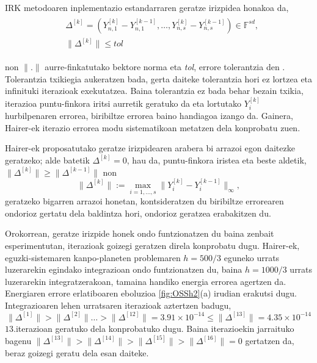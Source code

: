 IRK metodoaren inplementazio estandarraren geratze irizpidea honakoa da,
\begin{align}
\begin{split}
&\Delta^{[k]}=(Y_{n,1}^{[k]}-Y_{n,1}^{[k-1]},\dots,Y_{n,s}^{[k]}-Y_{n,s}^{[k-1]}) \in \mathbb{F}^{sd},\\
&\|\Delta^{[k]}\| \leqslant tol
\end{split}
\end{align} 

non $\|.\|$ aurre-finkatutako bektore norma eta \emph{tol}, errore tolerantzia  den . Tolerantzia txikiegia aukeratzen bada, gerta daiteke tolerantzia hori ez lortzea eta infinituki iterazioak exekutatzea. Baina tolerantzia ez bada behar bezain txikia, iterazioa puntu-finkora iritsi aurretik geratuko da eta lortutako $Y_i^{[k]}$ hurbilpenaren errorea, biribiltze errorea baino  handiagoa izango da. Gainera, Hairer-ek iterazio errorea modu sistematikoan metatzen dela konprobatu zuen.   

Hairer-ek proposatutako geratze irizpidearen arabera bi arrazoi egon daitezke geratzeko; alde batetik $\Delta^{[k]} = 0$, hau da, puntu-finkora iristea eta beste aldetik, $\|\Delta^{[k]}\| \geqslant \|\Delta^{[k-1]}\|$ non    
\begin{equation*}
\|\Delta^{[k]}\|:= \max_{i=1,\dots,s} \|Y_i^{[k]}-Y_i^{[k-1]}\|_{\infty},
\end{equation*}
geratzeko bigarren arrazoi honetan, kontsideratzen du biribiltze errorearen ondorioz gertatu dela baldintza hori, ondorioz geratzea erabakitzen du. 

Orokorrean, geratze irizpide honek ondo funtzionatzen du baina zenbait esperimentutan, iterazioak goizegi geratzen direla konprobatu dugu. Hairer-ek, eguzki-sistemaren kanpo-planeten problemaren $h=500/3$ eguneko urrats luzerarekin egindako integrazioan ondo funtzionatzen du, baina $h=1000/3$ urrats luzerarekin integratzerakoan, tamaina handiko energia errorea agertzen da. Energiaren errore erlatiboaren eboluzioa \ref{fig:OSSh2}(a) irudian erakutsi dugu. Integrazioaren lehen urratsaren iterazioak aztertzen badugu,
\begin{equation*}
\|\Delta^{[1]}\|>\|\Delta^{[2]}\| \dots > \|\Delta^{[12]}\|=3.91\times 10^{-14} \leqslant \|\Delta^{[13]}\|=4.35 \times 10^{-14} 
\end{equation*} 
$13.$iterazioan geratuko dela konprobatuko dugu. Baina iterazioekin jarraituko bagenu $\|\Delta^{[13]}\|>\|\Delta^{[14]}\|>\|\Delta^{[15]}\|>\|\Delta^{[16]}\|=0$ gertatzen da, beraz goizegi geratu dela esan daiteke.


